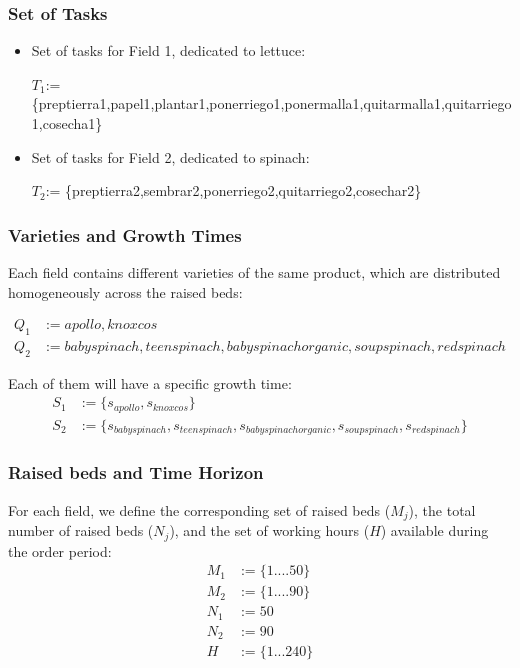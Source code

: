 \subsubsection{Set of Tasks}
\begin{itemize}
    \item Set of tasks for Field 1, dedicated to lettuce:

        $T_1$:= \{preptierra1,papel1,plantar1,ponerriego1,ponermalla1,quitarmalla1,quitarriego1,cosecha1\}    
    \item Set of tasks for Field 2, dedicated to spinach:

        $T_2$:= \{preptierra2,sembrar2,ponerriego2,quitarriego2,cosechar2\}
\end{itemize}

\subsubsection{Varieties and Growth Times}

Each field contains different varieties of the same product, which are distributed homogeneously across the raised beds:


\[\begin{aligned}
        Q_1&:={apollo, knoxcos}\\
        Q_2&:={babyspinach, teenspinach, babyspinachorganic, soupspinach, redspinach}
    \end{aligned}\]

Each of them will have a specific growth time:
\[\begin{aligned}
        S_1&:=\{s_{apollo},s_{knoxcos}\}\\
        S_2&:=\{s_{babyspinach}, s_{teenspinach}, s_{babyspinachorganic}, s_{soupspinach}, s_{redspinach}\}
    \end{aligned}\]



\subsubsection{Raised beds and Time Horizon}

For each field, we define the corresponding set of raised beds ($M_j$), the total number of raised beds ($N_j$),  
and the set of working hours ($H$) available during the order period:
    \[\begin{aligned}
        M_1&:=\{1....50\}\\
        M_2&:=\{1....90\}\\
        N_1&:=50\\
        N_2&:=90\\
        H&:=\{1...240\}
    \end{aligned}\]

